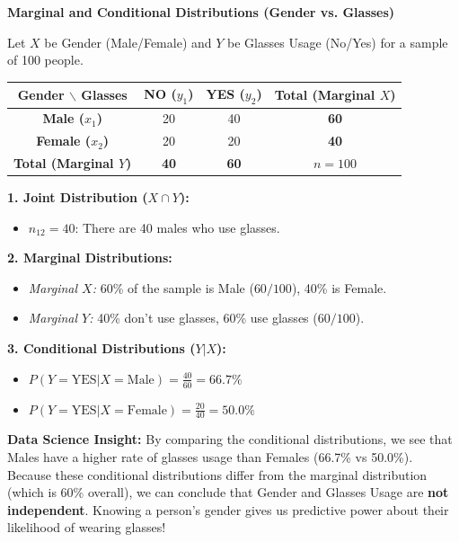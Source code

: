 \vspace{0.3cm}
\begin{example}{\textbf{Marginal and Conditional Distributions (Gender vs. Glasses)}}

Let $X$ be Gender (Male/Female) and $Y$ be Glasses Usage (No/Yes) for a sample of 100 people.

\vspace{0.2cm}
\begin{center}
\renewcommand{\arraystretch}{1.2}
\begin{tabular}{|c|cc|c|}
\hline
\textbf{Gender $\backslash$ Glasses} & \textbf{NO ($y_1$)} & \textbf{YES ($y_2$)} & \textbf{Total (Marginal $X$)} \\
\hline
\textbf{Male ($x_1$)} & 20 & 40 & \textbf{60} \\
\textbf{Female ($x_2$)} & 20 & 20 & \textbf{40} \\
\hline
\textbf{Total (Marginal $Y$)} & \textbf{40} & \textbf{60} & \textbf{$n=100$} \\
\hline
\end{tabular}
\end{center}
\vspace{0.2cm}

\textbf{1. Joint Distribution ($X \cap Y$):}
\begin{itemize}
    \item $n_{12} = 40$: There are 40 males who use glasses.
\end{itemize}

\pagebreak
\textbf{2. Marginal Distributions:}
\begin{itemize}
    \item \textit{Marginal $X$:} 60\% of the sample is Male ($60/100$), 40\% is Female.
    \item \textit{Marginal $Y$:} 40\% don't use glasses, 60\% use glasses ($60/100$).
\end{itemize}

\textbf{3. Conditional Distributions ($Y|X$):}
\begin{itemize}
    \item $P(Y=\text{YES} | X=\text{Male}) = \frac{40}{60} = 66.7\%$
    \item $P(Y=\text{YES} | X=\text{Female}) = \frac{20}{40} = 50.0\%$
\end{itemize}

\textbf{Data Science Insight:} 
By comparing the conditional distributions, we see that Males have a higher rate of glasses usage than Females (66.7\% vs 50.0\%). Because these conditional distributions differ from the marginal distribution (which is 60\% overall), we can conclude that Gender and Glasses Usage are \textbf{not independent}. Knowing a person's gender gives us predictive power about their likelihood of wearing glasses!
\end{example}

